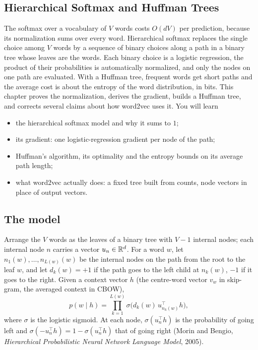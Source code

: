 \begin{notechapter}
\chapter{Hierarchical Softmax and Huffman Trees}\label{ch:hierarchical-softmax}

\begin{chapterintro}
The softmax over a vocabulary of $V$ words costs $O(dV)$ per prediction, because its
normalization sums over every word. Hierarchical softmax replaces the single choice among
$V$ words by a sequence of binary choices along a path in a binary tree whose leaves are
the words. Each binary choice is a logistic regression, the product of their probabilities
is automatically normalized, and only the nodes on one path are evaluated. With a Huffman
tree, frequent words get short paths and the average cost is about the entropy of the
word distribution, in bits. This chapter proves the normalization, derives the gradient,
builds a Huffman tree, and corrects several claims about how word2vec uses it. You will
learn
\begin{itemize}[nosep]
  \item the hierarchical softmax model and why it sums to $1$;
  \item its gradient: one logistic-regression gradient per node of the path;
  \item Huffman's algorithm, its optimality and the entropy bounds on its average path length;
  \item what word2vec actually does: a fixed tree built from counts, node vectors in place of
        output vectors.
\end{itemize}
\end{chapterintro}

\section{The model}\label{hierarchical-softmax:sec:model}

Arrange the $V$ words as the leaves of a binary tree with $V - 1$ internal nodes; each internal node $n$
carries a vector $u_n\in\mathbb{R}^d$. For a word $w$, let $n_1(w),\dots,n_{L(w)}(w)$ be the internal nodes on the path from the root
to the leaf $w$, and let $d_k(w) = +1$ if the path goes to the left child at $n_k(w)$, $-1$ if it goes to the right. Given
a context vector $h$ (the centre-word vector $v_w$ in skip-gram, the averaged context in CBOW),
\[
  p(w\mid h) = \prod_{k=1}^{L(w)}\sigma\bigl(d_k(w)\,u_{n_k(w)}^\top h\bigr),
\]
where $\sigma$ is the logistic sigmoid. At each node, $\sigma(u_n^\top h)$ is the probability of going left and
$\sigma(-u_n^\top h) = 1 - \sigma(u_n^\top h)$ that of going right (Morin and Bengio, \emph{Hierarchical Probabilistic Neural
Network Language Model}, 2005).


\end{notechapter}
